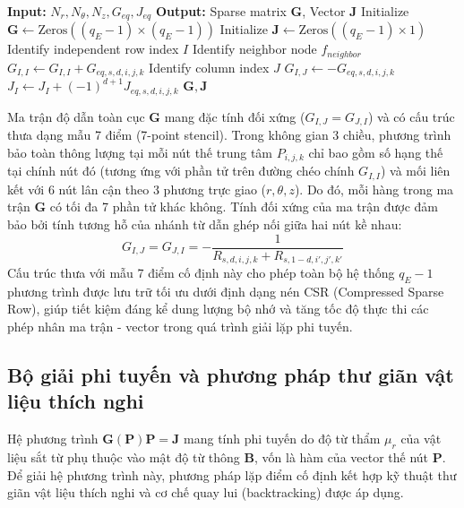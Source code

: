 \begin{algorithm}[htbp]
\caption{3D-MRN Matrix Assembly Procedure}
\label{alg:assembly}
\begin{algorithmic}[1]
\STATE \textbf{Input:} $N_r, N_\theta, N_z, G_{eq}, J_{eq}$
\STATE \textbf{Output:} Sparse matrix $\mathbf{G}$, Vector $\mathbf{J}$
\STATE Initialize $\mathbf{G} \leftarrow \text{Zeros}((q_E-1) \times (q_E-1))$
\STATE Initialize $\mathbf{J} \leftarrow \text{Zeros}((q_E-1) \times 1)$
        \STATE Identify independent row index $I$
            \STATE Identify neighbor node $f_{neighbor}$
            \STATE $G_{I,I} \leftarrow G_{I,I} + G_{eq,s,d,i,j,k}$
                \STATE Identify column index $J$
                \STATE $G_{I,J} \leftarrow -G_{eq,s,d,i,j,k}$
            \ENDIF
            \STATE $J_I \leftarrow J_I + (-1)^{d+1} J_{eq,s,d,i,j,k}$
        \ENDFOR
    \ENDIF
\ENDFOR
\STATE \RETURN $\mathbf{G}, \mathbf{J}$
\end{algorithmic}
\end{algorithm}

Ma trận độ dẫn toàn cục $\mathbf{G}$ mang đặc tính đối xứng ($G_{I,J} = G_{J,I}$) và có cấu trúc thưa dạng mẫu 7 điểm (7-point stencil). Trong không gian 3 chiều, phương trình bảo toàn thông lượng tại mỗi nút thế trung tâm $P_{i,j,k}$ chỉ bao gồm số hạng thế tại chính nút đó (tương ứng với phần tử trên đường chéo chính $G_{I,I}$) và mối liên kết với 6 nút lân cận theo 3 phương trực giao ($r, \theta, z$). Do đó, mỗi hàng trong ma trận $\mathbf{G}$ có tối đa 7 phần tử khác không. Tính đối xứng của ma trận được đảm bảo bởi tính tương hỗ của nhánh từ dẫn ghép nối giữa hai nút kề nhau:
\begin{equation}
    G_{I,J} = G_{J,I} = -\frac{1}{R_{s,d,i,j,k} + R_{s,1-d,i',j',k'}}
\end{equation}
Cấu trúc thưa với mẫu 7 điểm cố định này cho phép toàn bộ hệ thống $q_E - 1$ phương trình được lưu trữ tối ưu dưới định dạng nén CSR (Compressed Sparse Row), giúp tiết kiệm đáng kể dung lượng bộ nhớ và tăng tốc độ thực thi các phép nhân ma trận - vector trong quá trình giải lặp phi tuyến.

\subsection{Bộ giải phi tuyến và phương pháp thư giãn vật liệu thích nghi}
Hệ phương trình $\mathbf{G}(\mathbf{P})\mathbf{P} = \mathbf{J}$ mang tính phi tuyến do độ từ thẩm $\mu_r$ của vật liệu sắt từ phụ thuộc vào mật độ từ thông $\mathbf{B}$, vốn là hàm của vector thế nút $\mathbf{P}$. Để giải hệ phương trình này, phương pháp lặp điểm cố định kết hợp kỹ thuật thư giãn vật liệu thích nghi và cơ chế quay lui (backtracking) được áp dụng.

